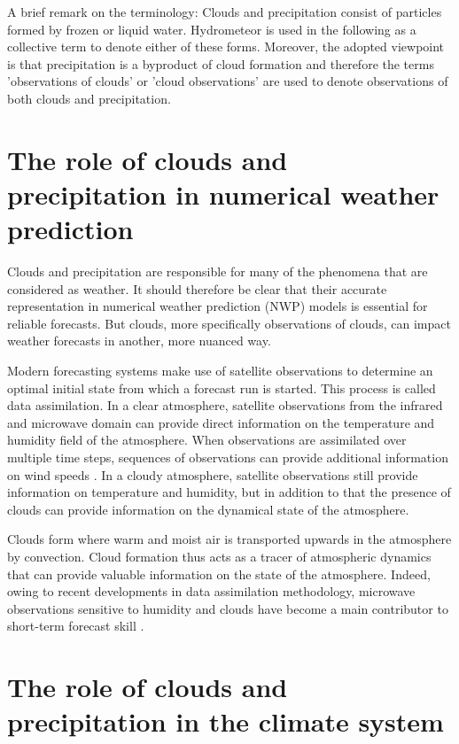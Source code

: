 A brief remark on the terminology: Clouds and precipitation consist of particles
formed by frozen or liquid water. Hydrometeor is used in the following as a
collective term to denote either of these forms. Moreover, the adopted viewpoint
is that precipitation is a byproduct of cloud formation and therefore the terms
'observations of clouds' or 'cloud observations' are used to denote observations
of both clouds and precipitation.

\section{The role of clouds and precipitation in numerical weather prediction}

Clouds and precipitation are responsible for many of the phenomena that are
considered as weather. It should therefore be clear that their accurate
representation in numerical weather prediction (NWP) models is essential for
reliable forecasts. But clouds, more specifically observations of clouds, can
impact weather forecasts in another, more nuanced way.

Modern forecasting systems make use of satellite observations to determine an
optimal initial state from which a forecast run is started. This process is
called data assimilation. In a clear atmosphere, satellite observations from the
infrared and microwave domain can provide direct information on the temperature
and humidity field of the atmosphere. When observations are assimilated over
multiple time steps, sequences of observations can provide additional
information on wind speeds \cite{geer18}. In a cloudy atmosphere, satellite
observations still provide information on temperature and humidity, but in
addition to that the presence of clouds can provide information on the dynamical
state of the atmosphere.

Clouds form where warm and moist air is transported upwards in the atmosphere
by convection. Cloud formation thus acts as a tracer of atmospheric dynamics
that can provide valuable information on the state of the atmosphere. Indeed,
owing to recent developments in data assimilation methodology, microwave
observations sensitive to humidity and clouds have become a main contributor
to short-term forecast skill \cite{geer17}.

\section{The role of clouds and precipitation in the climate system}


